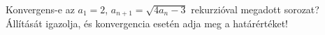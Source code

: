 \documentclass[11pt]{scrartcl}
\begin{document}
Konvergens-e az $a_1 = 2$, $a_{n + 1} = \sqrt{4a_n - 3}$ rekurzióval megadott
sorozat? Állítását igazolja, és konvergencia esetén adja meg a határértéket!
\end{document}
